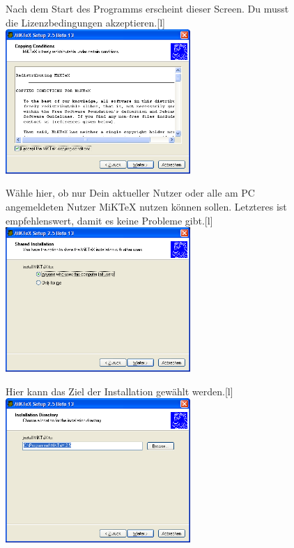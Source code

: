\begin{figure}[hb]
	\begin{captionbeside}{Nach dem Start des Programms erscheint dieser Screen. Du musst die Lizenzbedingungen akzeptieren.}[l]
		\includegraphics[width=7cm]{images/MiKTeX-install-01.png}
	\end{captionbeside}
	\label{fig:install01}
\end{figure}

\begin{figure}[hb]
	\begin{captionbeside}{Wähle hier, ob nur Dein aktueller Nutzer oder alle am PC angemeldeten Nutzer MiKTeX nutzen können sollen. Letzteres ist empfehlenswert, damit es keine Probleme gibt.}[l]
		\includegraphics[width=7cm]{images/MiKTeX-install-02.png}
	\end{captionbeside}
	\label{fig:install02}
\end{figure}

\begin{figure}[hb]
	\begin{captionbeside}{Hier kann das Ziel der Installation gewählt werden.}[l]
		\includegraphics[width=7cm]{images/MiKTeX-install-03.png}
	\end{captionbeside}
	\label{fig:install03}
\end{figure}

